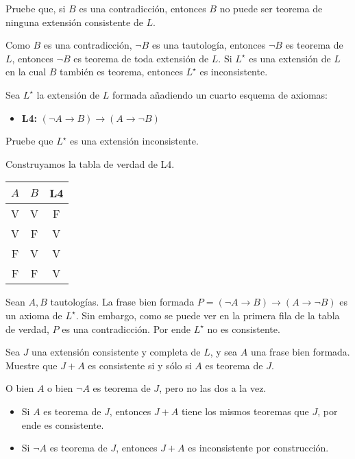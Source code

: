 \begin{exercise}
Pruebe que, si $B$ es una contradicción, entonces $B$ no puede ser teorema de ninguna extensión consistente de $L$.
\end{exercise}

\begin{solution}
Como $B$ es una contradicción, $\neg B$ es una tautología, entonces $\neg B$ es teorema de $L$, entonces $\neg B$ es teorema de toda extensión de $L$. Si $L^\star$ es una extensión de $L$ en la cual $B$ también es teorema, entonces $L^\star$ es inconsistente.
\end{solution}

\begin{exercise}
Sea $L^\star$ la extensión de $L$ formada añadiendo un cuarto esquema de axiomas:
\begin{itemize}
    \item \textbf{L4:} $(\neg A \to B) \to (A \to \neg B)$
\end{itemize}

Pruebe que $L^\star$ es una extensión inconsistente.
\end{exercise}

\begin{solution}
Construyamos la tabla de verdad de L4.

\begin{center}
\begin{tabular}{cc|c}
    $A$ & $B$ & L4 \\
    \hline
    V & V & F \\
    V & F & V \\
    F & V & V \\
    F & F & V \\
\end{tabular}
\end{center}

Sean $A,B$ tautologías. La frase bien formada $P = (\neg A \to B) \to (A \to \neg B)$ es un axioma de $L^\star$. Sin embargo, como se puede ver en la primera fila de la tabla de verdad, $P$ es una contradicción. Por ende $L^\star$ no es consistente.
\end{solution}

\begin{exercise}
Sea $J$ una extensión consistente y completa de $L$, y sea $A$ una frase bien formada. Muestre que $J+A$ es consistente si y sólo si $A$ es teorema de $J$.
\end{exercise}

\begin{solution}
O bien $A$ o bien $\neg A$ es teorema de $J$, pero no las dos a la vez.
\begin{itemize}
    \item Si $A$ es teorema de $J$, entonces $J+A$ tiene los mismos teoremas que $J$, por ende es consistente.
    \item Si $\neg A$ es teorema de $J$, entonces $J+A$ es inconsistente por construcción.
\end{itemize}
\end{solution}
